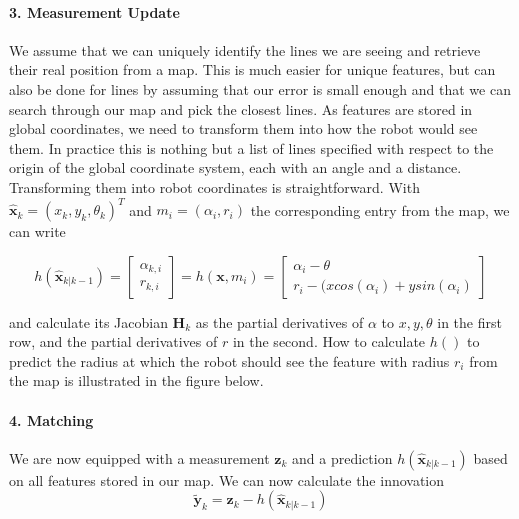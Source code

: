 \paragraph{3. Measurement Update}
We assume that we can uniquely identify the lines we are seeing and retrieve their real position from a map. This is much easier for unique features, but can also be done for lines by assuming that our error is small enough and that we can search through our map and pick the closest lines. As features are stored in global coordinates, we need to transform them into how the robot would see them. In practice this is nothing but a list of lines specified with respect to the origin of the global coordinate system, each with an angle and a distance. Transforming them into robot coordinates is straightforward. With  $ \hat{\boldsymbol{x}}_{k}=(x_{k},y_{k},\theta_k)^T$ and $ m_i=(\alpha_i,r_i)$ the corresponding entry from the map, we can write

\begin{equation} h(\hat{\boldsymbol{x}}_{k|k-1})=\left[\begin{array}{c}\alpha_{k,i}\\r_{k,i}\end{array}\right]=h(\boldsymbol{x},m_i)=\left[\begin{array}{c}\alpha_i-\theta\\r_i-(x cos(\alpha_i)+y sin(\alpha_i)\end{array}\right]
\end{equation}

and calculate its Jacobian $ \boldsymbol{H}_{k}$ as the partial derivatives of $ \alpha$ to $ x,y,\theta$ in the first row, and the partial derivatives of $ r$ in the second. How to calculate $ h()$ to predict the radius at which the robot should see the feature with radius $ r_i$ from the map is illustrated in the figure below.



\paragraph{4. Matching}
We are now equipped with a measurement $ \boldsymbol{z}_k$ and a prediction $ h(\hat{\boldsymbol{x}}_{k|k-1})$ based on all features stored in our map. We can now calculate the innovation
\begin{equation}
\tilde{\boldsymbol{y}}_{k}=\boldsymbol{z}_{k}-h(\hat{\boldsymbol{x}}_{k|k-1})
\end{equation}

